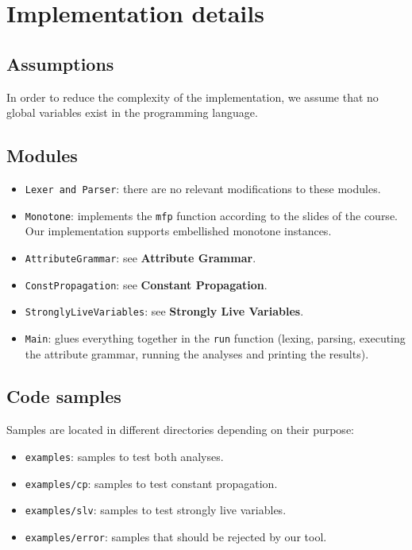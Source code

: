 \documentclass{article}
\begin{document}
\section{Implementation details}


\subsection*{Assumptions}

In order to reduce the complexity of the implementation, we assume that no global variables exist in the programming language.

\subsection*{Modules}

\begin{itemize}
	\item \texttt{Lexer and Parser}: there are no relevant modifications to these modules.
	\item \texttt{Monotone}: implements the \texttt{mfp} function according to the slides of the course. Our implementation supports embellished monotone instances.
	\item \texttt{AttributeGrammar}: see \textbf{Attribute Grammar}.
	\item \texttt{ConstPropagation}: see \textbf{Constant Propagation}.
	\item \texttt{StronglyLiveVariables}: see \textbf{Strongly Live Variables}.
	\item \texttt{Main}: glues everything together in the \texttt{run} function (lexing, parsing, executing the attribute grammar, running the analyses and printing the results).
\end{itemize}

\subsection*{Code samples}

Samples are located in different directories depending on their purpose:

\begin{itemize}
	\item \texttt{examples}: samples to test both analyses.
	\item \texttt{examples/cp}: samples to test constant propagation.
	\item \texttt{examples/slv}: samples to test strongly live variables.
	\item \texttt{examples/error}: samples that should be rejected by our tool.
\end{itemize}
\end{document}
